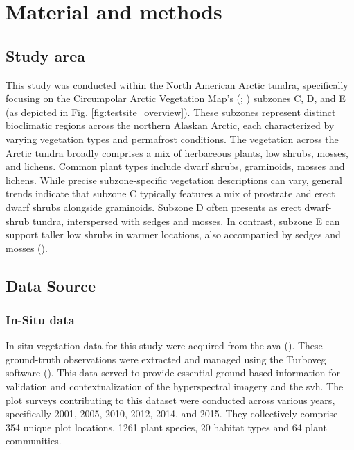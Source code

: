 \chapter{Material and methods} %
\label{Chapter2}

\section{Study area}
This study was conducted within the North American Arctic tundra, specifically focusing on the Circumpolar Arctic Vegetation Map's (\cite{walker_circumpolar_2005}; \cite{walker_circumpolar_2016}) subzones C, D, and E (as depicted in Fig. \ref{fig:testsite_overview}). These subzones represent distinct bioclimatic regions across the northern Alaskan Arctic, each characterized by varying vegetation types and permafrost conditions. The vegetation across the Arctic tundra broadly comprises a mix of herbaceous plants, low shrubs, mosses, and lichens. Common plant types include dwarf shrubs, graminoids, mosses and lichens. While precise subzone-specific vegetation descriptions can vary, general trends indicate that subzone C typically features a mix of prostrate and erect dwarf shrubs alongside graminoids. Subzone D often presents as erect dwarf-shrub tundra, interspersed with sedges and mosses. In contrast, subzone E can support taller low shrubs in warmer locations, also accompanied by sedges and mosses (\cite{walker_circumpolar_2005}).

\section{Data Source}
\subsection{In-Situ data}
In-situ vegetation data for this study were acquired from the \ac{ava} (\cite{noauthor_current_nodate}). These ground-truth observations were extracted and managed using the Turboveg software (\cite{hennekens_stephan_m_turboveg_2001}). This data served to provide essential ground-based information for validation and contextualization of the hyperspectral imagery and the \ac{svh}. The plot surveys contributing to this dataset were conducted across various years, specifically 2001, 2005, 2010, 2012, 2014, and 2015. They collectively comprise 354 unique plot locations, 1261 plant species, 20 habitat types and 64 plant communities.
